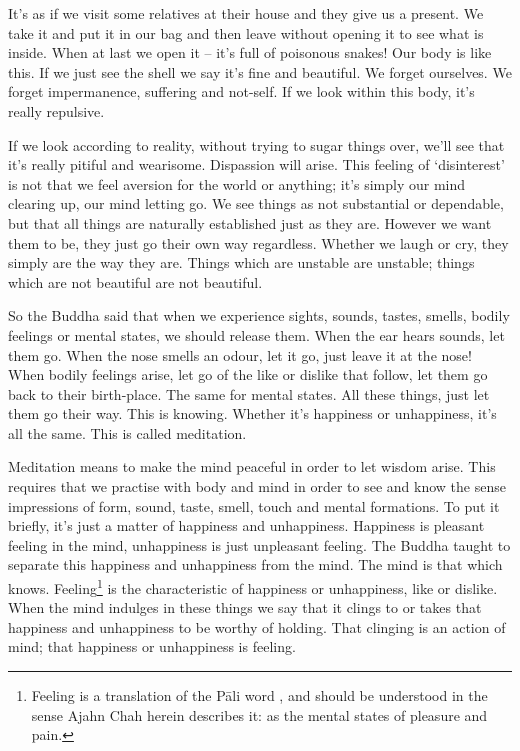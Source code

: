 It's as if we visit some relatives at their house and they give us a present. We take it and put it in our bag and then leave without opening it to see what is inside. When at last we open it -- it's full of poisonous snakes! Our body is like this. If we just see the shell we say it's fine and beautiful. We forget ourselves. We forget impermanence, suffering and not-self. If we look within this body, it's really repulsive. 

If we look according to reality, without trying to sugar things over, we'll see that it's really pitiful and wearisome. Dispassion will arise. This feeling of `disinterest' is not that we feel aversion for the world or anything; it's simply our mind clearing up, our mind letting go. We see things as not substantial or dependable, but that all things are naturally established just as they are. However we want them to be, they just go their own way regardless. Whether we laugh or cry, they simply are the way they are. Things which are unstable are unstable; things which are not beautiful are not beautiful. 

So the Buddha said that when we experience sights, sounds, tastes, smells, bodily feelings or mental states, we should release them. When the ear hears sounds, let them go. When the nose smells an odour, let it go, just leave it at the nose! When bodily feelings arise, let go of the like or dislike that follow, let them go back to their birth-place. The same for mental states. All these things, just let them go their way. This is knowing. Whether it's happiness or unhappiness, it's all the same. This is called meditation. 

Meditation means to make the mind peaceful in order to let wisdom arise. This requires that we practise with body and mind in order to see and know the sense impressions of form, sound, taste, smell, touch and mental formations. To put it briefly, it's just a matter of happiness and unhappiness. Happiness is pleasant feeling in the mind, unhappiness is just unpleasant feeling. The Buddha taught to separate this happiness and unhappiness from the mind. The mind is that which knows. Feeling\footnote{Feeling is a translation of the P\=ali word , and should be understood in the sense Ajahn Chah herein describes it: as the mental states of pleasure and pain.} is the characteristic of happiness or unhappiness, like or dislike. When the mind indulges in these things we say that it clings to or takes that happiness and unhappiness to be worthy of holding. That clinging is an action of mind; that happiness or unhappiness is feeling. 


